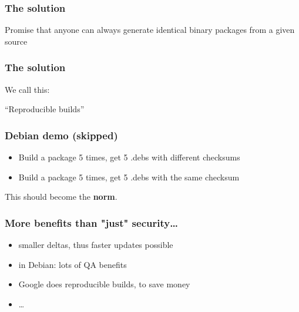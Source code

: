 \documentclass[14pt,aspectratio=169]{beamer}
\newif\ifplacelogo
\begin{document}
\begin{frame}
 \frametitle{The solution}

 \begin{center}
 \Large{
 Promise that anyone can always generate
 identical binary packages
 from a given source}
\end{center}
\end{frame}


\begin{frame}
 \frametitle{The solution}

 \begin{center}
 We call this:

 \Huge{ “Reproducible builds” }
 \end{center}
\end{frame}

\placelogotrue

\begin{frame}
 \frametitle{Debian demo (skipped)}
 \begin{itemize}
 \item Build a package 5 times, get 5 .debs with different checksums
 \item Build a package 5 times, get 5 .debs with the same checksum\\
 \end{itemize}
%
%
\end{frame}

\placelogofalse

\begin{frame}[plain]
\begin{center}
 \Huge{This should become the \textbf{norm}.}

\end{center}
\end{frame}

\begin{frame}[fragile]
 \frametitle{More benefits than "just" security…}
 \begin{itemize}
  \item smaller deltas, thus faster updates possible
  \item in Debian: lots of QA benefits
  \item Google does reproducible builds, to save money
  \item …
 \end{itemize}
\end{frame}
\end{document}
